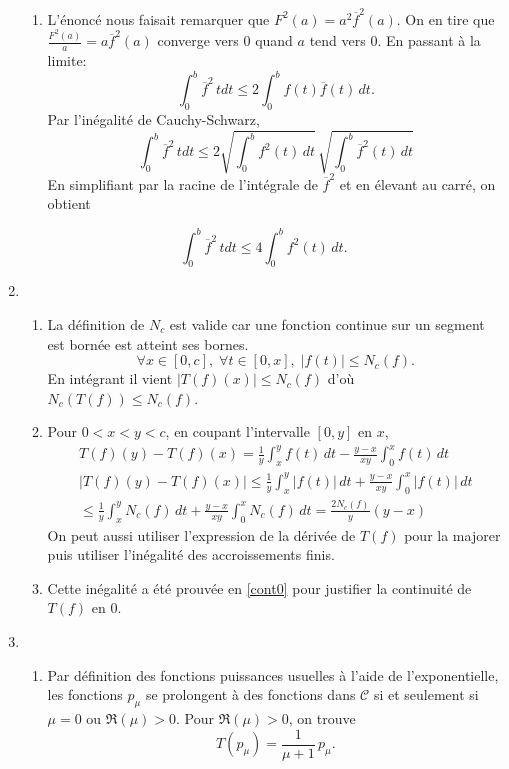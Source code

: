 \begin{enumerate}
\begin{enumerate}
 \item L'énoncé nous faisait remarquer que $F^2(a) = a^2\overline{f}^2(a)$. On en tire que $\frac{F^2(a)}{a}=a \overline{f}^2(a)$ converge vers $0$ quand $a$ tend vers $0$. En passant à la limite:
\begin{displaymath}
\int_0^b \overline{f}^2\,t dt \leq 2\int_0^b f(t)\overline{f}(t)\, dt  .
\end{displaymath}
Par l'inégalité de Cauchy-Schwarz,
\begin{displaymath}
\int_0^b \overline{f}^2\,t dt \leq 2 \sqrt{\int_0^b f^2(t)\, dt} \, \sqrt{\int_0^b \overline{f}^2(t)\, dt}  
\end{displaymath}
En simplifiant par la racine de l'intégrale de $\overline{f}^2$ et en élevant au carré, on obtient
\end{enumerate}
\begin{displaymath}
\int_0^b \overline{f}^2\,t dt \leq  4\int_0^b f^2(t)\, dt  .
\end{displaymath}

 \item
\begin{enumerate}
 \item \label{born} La définition de $N_c$ est valide car une fonction continue sur un segment est bornée est atteint ses bornes.
\[
 \forall x\in [0,c],\; \forall t\in [0,x], \;|f(t)|\leq N_c(f).
\]
En intégrant il vient $|T(f)(x)| \leq N_c(f)$ d'où $N_c(T(f)) \leq N_c(f)$.

 \item \label{majdif} Pour $0<x<y<c$, en coupant l'intervalle $[0,y]$ en $x$,
\begin{multline*}
 T(f)(y)-T(f)(x)
=\frac{1}{y}\int_x^yf(t)\,dt - \frac{y-x}{xy}\int_0^xf(t)\,dt\\
\left|T(f)(y)-T(f)(x)\right| \leq \frac{1}{y}\int_x^y|f(t)|\,dt + \frac{y-x}{xy}\int_0^x|f(t)|\,dt\\
\leq \frac{1}{y}\int_x^yN_c(f)\,dt + \frac{y-x}{xy}\int_0^xN_c(f)\,dt
= \frac{2N_c(f)}{y}(y-x)
\end{multline*}
On peut aussi utiliser l'expression de la dérivée de $T(f)$ pour la majorer puis utiliser l'inégalité des accroissements finis.
 \item Cette inégalité a été prouvée en \ref{cont0} pour justifier la continuité de $T(f)$ en $0$.
\end{enumerate}

 \item
\begin{enumerate}
 \item Par définition des fonctions puissances usuelles à l'aide de l'exponentielle, les fonctions $p_\mu$ se prolongent à des fonctions dans $\mathcal{C}$ si et seulement si $\mu=0$ ou $\Re(\mu)>0$.\newline
Pour $\Re(\mu) > 0$, on trouve 
\begin{displaymath}
 T(p_\mu) = \frac{1}{\mu +1}\, p_\mu .
\end{displaymath}


\end{enumerate}
\end{enumerate}
